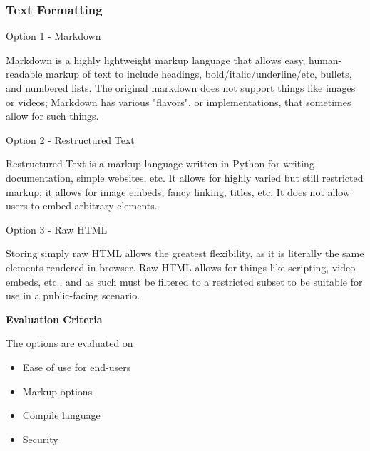 \documentclass[letterpaper, 10pt, draftclsnofoot, compsoc, onecolumn]{IEEEtran}
\begin{document}
{\newpage
\subsubsection{Text Formatting}
{\noindent \par}
{\noindent Option 1 - Markdown \par}
{\noindent Markdown is a highly lightweight markup language that allows easy, human-readable markup
of text to include headings, bold/italic/underline/etc, bullets, and numbered lists. The original markdown does not support
things like images or videos; Markdown has various "flavors", or implementations, that sometimes
allow for such things. \par}
{\noindent Option 2 - Restructured Text \par}
{\noindent Restructured Text is a markup language written in Python for writing documentation, simple websites,
etc. It allows for highly varied but still restricted markup; it allows for image embeds, fancy linking,
titles, etc. It does not allow users to embed arbitrary elements. \par}
{\noindent Option 3 - Raw HTML \par}
{\noindent Storing simply raw HTML allows the greatest flexibility, as it is literally the same elements
rendered in browser. Raw HTML allows for things like scripting, video embeds, etc., and as such must
be filtered to a restricted subset to be suitable for use in a public-facing scenario. \par}

\medskip
\newpage
{\noindent\rmfamily\bfseries\color{black} Evaluation Criteria \par}
{\noindent The options are evaluated on

\begin{itemize}
\item Ease of use for end-users
\item Markup options
\item Compile language
\item Security
\end{itemize}

 \par}


}
\end{document}
